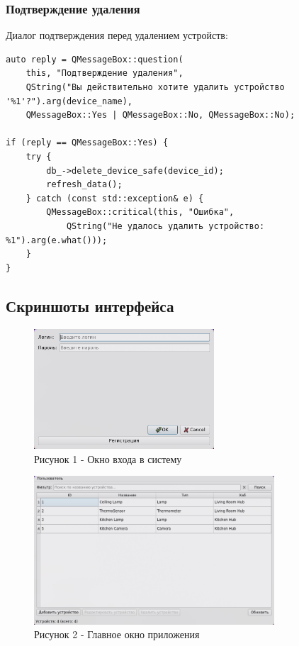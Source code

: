 \documentclass[oneside,a4paper,14pt]{extarticle}
\begin{document}
\subsubsection*{Подтверждение удаления}
\noindent Диалог подтверждения перед удалением устройств:

\begin{verbatim}
auto reply = QMessageBox::question(
    this, "Подтверждение удаления",
    QString("Вы действительно хотите удалить устройство '%1'?").arg(device_name),
    QMessageBox::Yes | QMessageBox::No, QMessageBox::No);

if (reply == QMessageBox::Yes) {
    try {
        db_->delete_device_safe(device_id);
        refresh_data();
    } catch (const std::exception& e) {
        QMessageBox::critical(this, "Ошибка",
            QString("Не удалось удалить устройство: %1").arg(e.what()));
    }
}
\end{verbatim}

\subsection*{Скриншоты интерфейса}

\begin{figure}[H]
  \centering
  \includegraphics[width=0.6\textwidth]{pics/login.png}
  \caption*{Рисунок 1 - Окно входа в систему}
\end{figure}

\begin{figure}[H]
  \centering
  \includegraphics[width=0.8\textwidth]{pics/main_window.png}
  \caption*{Рисунок 2 - Главное окно приложения}
\end{figure}
\end{document}
